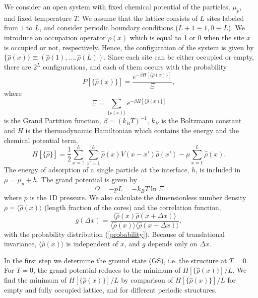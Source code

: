 \documentclass[preprint,
prl,%
aps]{revtex4}
\begin{document}
We consider an open system with fixed chemical potential
of the particles, $\mu_p$, and fixed temperature $T$. 
We assume that the lattice consists of 
$L$ sites labeled from $1$ to $L$,
and consider periodic boundary conditions ($L+1\equiv 1, 0\equiv L$).
We  introduce an occupation operator $\hat\rho(x)$ which is equal to 1 or 0 when the site 
$x$ is occupied or not, respectively. 
Hence, the configuration of the system is given by
$\{\hat\rho(x)\}\equiv(\hat\rho(1),...,\hat\rho(L))$. Since each site can be either occupied or empty, 
there are $2^L$ configurations, and each of them occurs with 
the probability 
\begin{equation}
\label{probability}
P[\{\hat\rho(x)\}]=\frac{e^{-\beta H[\{\hat\rho(x)\}]}}{\Xi},
\end{equation}  
where
\begin{equation}
\label{Xi}
 \Xi=\sum_{\{\hat\rho(x)\}} e^{-\beta H[\{\hat\rho(x)\}]}
\end{equation}
 is the Grand Partition function, $\beta=(k_BT)^{-1}$, $k_B$ is the Boltzmann constant
and $H$ is the thermodynamic Hamiltonian which
contains the energy and the chemical potential term,
\begin{equation}
\label{H}
  H [\{\hat\rho\}] = \frac{1}{2} \sum_{x=1}^L\sum_{x'=1}^L \hat{\rho}( x) V ( x-x')\hat{\rho}(x')
- \mu \sum_{x=1}^L \hat{\rho}( x).
  \end{equation}
The energy of adsorption of a single particle at the interface, $h$, is included in $\mu=\mu_p+h$.  
The grand potential is given by
\begin{equation}
\Omega=-pL=-k_BT\ln \Xi
\label{Omega}
 \end{equation}
where $p$ is the 1D pressure.
We  also calculate 
 the dimensionless number density 
 $\rho=\langle \hat\rho(x)\rangle $ (length fraction of the cores) and the correlation function,
\begin{equation}
\label{correlation}
g(\Delta x)=\frac{\langle \hat\rho(x)\hat\rho(x+\Delta x)\rangle}
{\langle \hat\rho(x)\rangle\langle \hat\rho(x+\Delta x)\rangle},
\end{equation}
 with the probability distribution (\ref{probability}).
Because of translational invariance, $\langle \hat\rho(x)\rangle$ is independent of $x$, and $g$ depends
only on $\Delta x$. 

In the first step we  determine the ground state (GS), i.e. the structure at $T=0$. 
For $T=0$, the grand potential 
reduces to the minimum of $H [\{\hat\rho(x)\}]/L$. We  find  the minimum of $H [\{\hat\rho(x)\}]/L$
by comparison of $H [\{\hat\rho(x)\}]/L$ for empty and fully occupied lattice, and for 
different periodic structures. 
\end{document}
